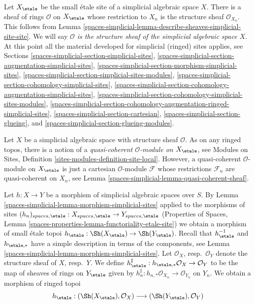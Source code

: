 \medskip\noindent
Let $X_\etale$ be the small \'etale site of a simplicial algebraic space $X$.
There is a sheaf of rings $\mathcal{O}$ on $X_\etale$ whose restriction
to $X_n$ is the structure sheaf $\mathcal{O}_{X_n}$. This follows from
Lemma \ref{spaces-simplicial-lemma-describe-sheaves-simplicial-site-site}. We will say
{\it $\mathcal{O}$ is the structure sheaf of the
simplicial algebraic space $X$}.
At this point all the material developed for simplicial (ringed) sites
applies, see Sections \ref{spaces-simplicial-section-simplicial-sites},
\ref{spaces-simplicial-section-augmentation-simplicial-sites},
\ref{spaces-simplicial-section-morphism-simplicial-sites},
\ref{spaces-simplicial-section-simplicial-sites-modules},
\ref{spaces-simplicial-section-cohomology-simplicial-sites},
\ref{spaces-simplicial-section-cohomology-augmentation-simplicial-sites},
\ref{spaces-simplicial-section-cohomology-simplicial-sites-modules},
\ref{spaces-simplicial-section-cohomology-augmentation-ringed-simplicial-sites},
\ref{spaces-simplicial-section-cartesian},
\ref{spaces-simplicial-section-glueing}, and
\ref{spaces-simplicial-section-glueing-modules}.

\medskip\noindent
Let $X$ be a simplicial algebraic space with structure sheaf $\mathcal{O}$.
As on any ringed topos, there is a notion
of a {\it quasi-coherent $\mathcal{O}$-module on $X_\etale$}, see
Modules on Sites, Definition \ref{sites-modules-definition-site-local}.
However, a quasi-coherent $\mathcal{O}$-module on $X_\etale$ is
just a cartesian $\mathcal{O}$-module $\mathcal{F}$ whose restrictions
$\mathcal{F}_n$ are quasi-coherent on $X_n$, see
Lemma \ref{spaces-simplicial-lemma-quasi-coherent-sheaf}.

\medskip\noindent
Let $h : X \to Y$ be a morphism of simplicial algebraic spaces over $S$.
By Lemma \ref{spaces-simplicial-lemma-morphism-simplicial-sites} applied to the morphisms
of sites $(h_n)_{spaces, \etale} : X_{spaces, \etale} \to Y_{spaces, \etale}$
(Properties of Spaces, Lemma
\ref{spaces-properties-lemma-functoriality-etale-site})
we obtain a morphism of small \'etale topoi
$h_\etale : \Sh(X_\etale) \to \Sh(Y_\etale)$.
Recall that $h_\etale^{-1}$ and $h_{\etale, *}$ have a simple
description in terms of the components, see
Lemma \ref{spaces-simplicial-lemma-morphism-simplicial-sites}.
Let $\mathcal{O}_X$, resp.\ $\mathcal{O}_Y$ denote the structure
sheaf of $X$, resp.\ $Y$. We define
$h_\etale^\sharp : h_{\etale, *}\mathcal{O}_X \to \mathcal{O}_Y$
to be the map of sheaves of rings on $Y_\etale$ given by
$h_n^\sharp : h_{n, *}\mathcal{O}_{X_n} \to \mathcal{O}_{Y_n}$ on $Y_n$.
We obtain a morphism of ringed topoi
$$
h_\etale :
(\Sh(X_\etale), \mathcal{O}_X)
\longrightarrow
(\Sh(Y_\etale), \mathcal{O}_Y)
$$

